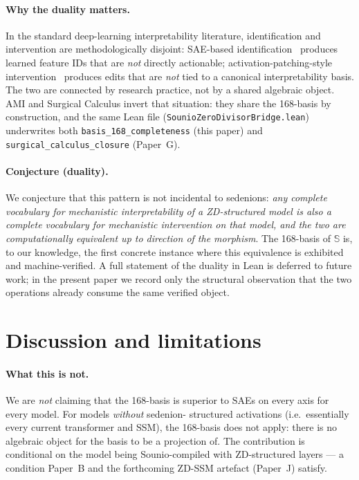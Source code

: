 \documentclass{article}
\newcommand{\sio}{\mathbb{S}}
\begin{document}
\paragraph{Why the duality matters.}
In the standard deep-learning interpretability literature, identification
and intervention are methodologically disjoint: SAE-based
identification~\cite{bricken2023monosemanticity,cunningham2023sparse}
produces learned feature IDs that are \emph{not} directly actionable;
activation-patching-style intervention~\cite{meng2022rome}
produces edits that are \emph{not} tied to a canonical interpretability
basis.  The two are connected by research practice, not by a shared
algebraic object.  AMI and Surgical Calculus invert that situation:
they share the 168-basis by construction, and the same Lean file
(\texttt{SounioZeroDivisorBridge.lean}) underwrites both
\texttt{basis\_168\_completeness} (this paper) and
\texttt{surgical\_calculus\_closure} (Paper~G).

\paragraph{Conjecture (duality).}
We conjecture that this pattern is not incidental to sedenions:
\emph{any complete vocabulary for mechanistic interpretability of a
ZD-structured model is also a complete vocabulary for mechanistic
intervention on that model, and the two are computationally equivalent
up to direction of the morphism}.  The 168-basis of $\sio$ is,
to our knowledge, the first concrete instance where this equivalence
is exhibited and machine-verified.  A full statement of the duality
in Lean is deferred to future work; in the present paper we record
only the structural observation that the two operations already
consume the same verified object.

\section{Discussion and limitations}

\paragraph{What this is not.}
We are \emph{not} claiming that the 168-basis is superior to SAEs on
every axis for every model.  For models \emph{without} sedenion-
structured activations (i.e.\ essentially every current transformer
and SSM), the 168-basis does not apply: there is no algebraic object
for the basis to be a projection of.  The contribution is conditional
on the model being Sounio-compiled with ZD-structured layers --- a
condition Paper~B and the forthcoming ZD-SSM artefact (Paper~J) satisfy.
\end{document}
